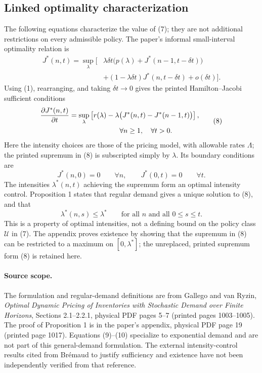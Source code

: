 \documentclass{article}
\begin{document}
\subsection*{Linked optimality characterization}
The following equations characterize the value of (7); they are not additional restrictions on every admissible policy. The paper's informal small-interval optimality relation is
\[
\begin{aligned}
J^*(n,t)=\sup_\lambda\bigl[&\lambda\delta t
 \bigl(p(\lambda)+J^*(n-1,t-\delta t)\bigr)\\
 &+(1-\lambda\delta t)J^*(n,t-\delta t)+o(\delta t)\bigr].
\end{aligned}
\]
Using (1), rearranging, and taking $\delta t\to0$ gives the printed Hamilton--Jacobi sufficient conditions
\begin{equation}
\begin{aligned}
\frac{\partial J^*(n,t)}{\partial t}
 &=\sup_\lambda\left[r(\lambda)-\lambda\bigl(J^*(n,t)-J^*(n-1,t)\bigr)\right],\\
 &\hspace{25mm}\forall n\geq1,\quad\forall t>0.
\end{aligned}
\tag{8}
\end{equation}
Here the intensity choices are those of the pricing model, with allowable rates $\Lambda$; the printed supremum in (8) is subscripted simply by $\lambda$. Its boundary conditions are
\[
J^*(n,0)=0\qquad\forall n,
\qquad
J^*(0,t)=0\qquad\forall t.
\]
The intensities $\lambda^*(n,t)$ achieving the supremum form an optimal intensity control. Proposition 1 states that regular demand gives a unique solution to (8), and that
\[
\lambda^*(n,s)\leq\lambda^*
\qquad\text{for all }n\text{ and all }0\leq s\leq t.
\]
This is a property of optimal intensities, not a defining bound on the policy class $\mathcal U$ in (7). The appendix proves existence by showing that the supremum in (8) can be restricted to a maximum on $[0,\lambda^*]$; the unreplaced, printed supremum form (8) is retained here.

\paragraph{Source scope.}
The formulation and regular-demand definitions are from Gallego and van Ryzin, \emph{Optimal Dynamic Pricing of Inventories with Stochastic Demand over Finite Horizons}, Sections 2.1--2.2.1, physical PDF pages 5--7 (printed pages 1003--1005). The proof of Proposition 1 is in the paper's appendix, physical PDF page 19 (printed page 1017). Equations (9)--(10) specialize to exponential demand and are not part of this general-demand formulation. The external intensity-control results cited from Br\'emaud to justify sufficiency and existence have not been independently verified from that reference.
\end{document}
